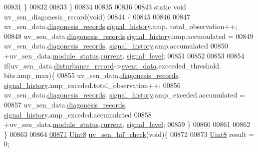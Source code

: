 \begin{DoxyCode}
00831        \}
00832 
00833 \}
00834 
00835 
00836 
00843  \textcolor{keyword}{static} \textcolor{keywordtype}{void} uv\_sen\_diagonesis\_record(\textcolor{keywordtype}{void})
00844  \{
00845 
00846               
00847              uv\_sen\_data.\hyperlink{a00035_a7ae905b560513ad201e58c2f63375030}{diagonesis\_records}.\hyperlink{a00017_affb63906d23cb1cb7787d61eaaedfb60}{signal\_history}.amp.
      total\_observation++;
00848              uv\_sen\_data.\hyperlink{a00035_a7ae905b560513ad201e58c2f63375030}{diagonesis\_records}.\hyperlink{a00017_affb63906d23cb1cb7787d61eaaedfb60}{signal\_history}.amp.accumulated 
      =
00849                      uv\_sen\_data.\hyperlink{a00035_a7ae905b560513ad201e58c2f63375030}{diagonesis\_records}.
      \hyperlink{a00017_affb63906d23cb1cb7787d61eaaedfb60}{signal\_history}.amp.accumulated
00850                      +uv\_sen\_data.\hyperlink{a00035_a5a53c391562b059eb744ac679f3765ca}{module\_status}.\hyperlink{a00017_ab8af48cdbba92b3ae39c4470e53af944}{current}.
      \hyperlink{a00017_abcdf2bc0c2e5a14863938ae28c3bc96e}{signal\_level};
00851 
00852 
00853 
00854              \textcolor{keywordflow}{if}(uv\_sen\_data.\hyperlink{a00035_ac9b38e2c1d3f1013a88d33506c754152}{disturbance\_record}->\hyperlink{a00028_a8c0bda69e71ef674e60da47ad0be9ab0}{event\_data}.exceeded\_threshold.
      bits.amp\_max)\{
00855                     uv\_sen\_data.\hyperlink{a00035_a7ae905b560513ad201e58c2f63375030}{diagonesis\_records}.
      \hyperlink{a00017_affb63906d23cb1cb7787d61eaaedfb60}{signal\_history}.amp\_exceded.total\_observation++;
00856                     uv\_sen\_data.\hyperlink{a00035_a7ae905b560513ad201e58c2f63375030}{diagonesis\_records}.
      \hyperlink{a00017_affb63906d23cb1cb7787d61eaaedfb60}{signal\_history}.amp\_exceded.accumulated =
00857                      uv\_sen\_data.\hyperlink{a00035_a7ae905b560513ad201e58c2f63375030}{diagonesis\_records}.
      \hyperlink{a00017_affb63906d23cb1cb7787d61eaaedfb60}{signal\_history}.amp\_exceded.accumulated
00858                      +uv\_sen\_data.\hyperlink{a00035_a5a53c391562b059eb744ac679f3765ca}{module\_status}.\hyperlink{a00017_ab8af48cdbba92b3ae39c4470e53af944}{current}.
      \hyperlink{a00017_abcdf2bc0c2e5a14863938ae28c3bc96e}{signal\_level};
00859              \}
00860 
00861 
00862  \}
00863 
00864 
\hypertarget{a00073_source_l00871}{}\hyperlink{a00073_a7655317bd792ec00a58a1e8bcca3aed6}{00871} \hyperlink{a00072_af84840501dec18061d18a68c162a8fa2}{Uint8} \hyperlink{a00073_a7655317bd792ec00a58a1e8bcca3aed6}{uv\_sen\_hif\_check}(\textcolor{keywordtype}{void})\{
00872 
00873     \hyperlink{a00072_af84840501dec18061d18a68c162a8fa2}{Uint8} result = 0;

\end{DoxyCode}
